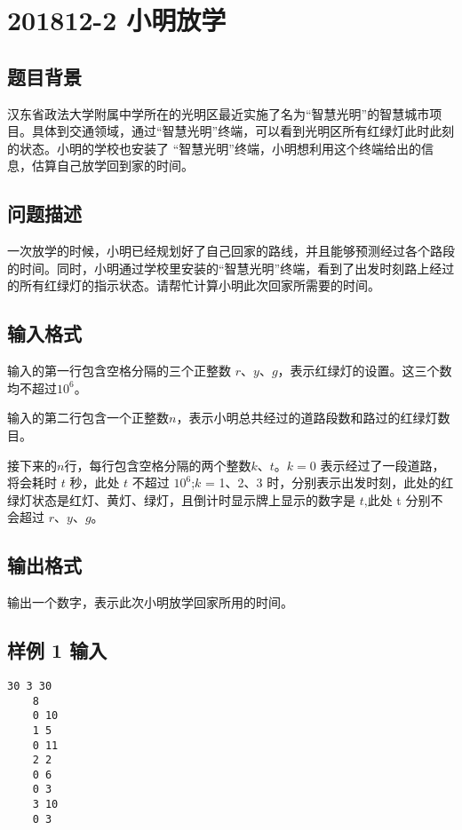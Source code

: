 \section{201812-2 小明放学}

\subsection{题目背景}

汉东省政法大学附属中学所在的光明区最近实施了名为“智慧光明”的智慧城市项目。具体到交通领域，通过“智慧光明”终端，可以看到光明区所有红绿灯此时此刻的状态。小明的学校也安装了
“智慧光明”终端，小明想利用这个终端给出的信息，估算自己放学回到家的时间。

\subsection{问题描述}

一次放学的时候，小明已经规划好了自己回家的路线，并且能够预测经过各个路段的时间。同时，小明通过学校里安装的“智慧光明”终端，看到了出发时刻路上经过的所有红绿灯的指示状态。请帮忙计算小明此次回家所需要的时间。

\subsection{输入格式}

输入的第一行包含空格分隔的三个正整数 $r、y、g$，表示红绿灯的设置。这三个数均不超过$10^6$。

输入的第二行包含一个正整数$n$，表示小明总共经过的道路段数和路过的红绿灯数目。

接下来的$n$行，每行包含空格分隔的两个整数$k、t$。$k = 0$ 表示经过了一段道路，将会耗时 $t$ 秒，此处 $t$ 不超过 $10^6$;$k$ = 1、2、3 时，分别表示出发时刻，此处的红绿灯状态是红灯、黄灯、绿灯，且倒计时显示牌上显示的数字是 $t$,此处 t 分别不会超过 $r、y、g$。

\subsection{输出格式}

输出一个数字，表示此次小明放学回家所用的时间。

\subsection{样例 1 输入}

\begin{lstlisting}[numbers=none]
    30 3 30
    8
    0 10
    1 5
    0 11
    2 2
    0 6
    0 3
    3 10
    0 3
\end{lstlisting}

